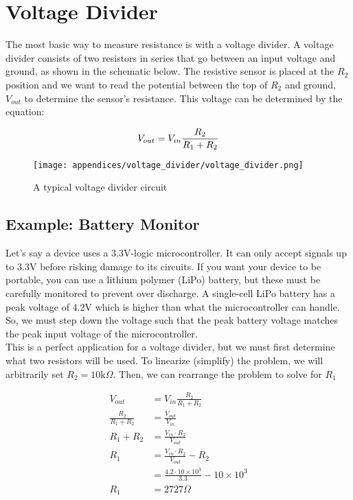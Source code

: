 \chapter{Voltage Divider} 
The most basic way to measure resistance is with a voltage divider.
A voltage divider consists of two resistors in series that go between an input voltage and ground, as shown in the schematic below.
The resistive sensor is placed at the $R_2$ position and we want to read the potential between the top of $R_2$ and ground, $V_{out}$ to determine the sensor's resistance.
This voltage can be determined by the equation:

\begin{equation} \labeq{voltage_divider}
    V_{out} = V_{in} \frac{R_2}{R_1 + R_2}
\end{equation}

\begin{figure}[h!]
    \caption{A typical voltage divider circuit}
    \centering
    \texttt{[image: appendices/voltage\_divider/voltage\_divider.png]}
\end{figure}

\section{Example: Battery Monitor}
Let's say a device uses a 3.3V-logic microcontroller.
It can only accept signals up to 3.3V before risking damage to its circuits.
If you want your device to be portable, you can use a lithium polymer (LiPo) battery, but these must be carefully monitored to prevent over discharge.
A single-cell LiPo battery has a peak voltage of 4.2V which is higher than what the microcontroller can handle.
So, we must step down the voltage such that the peak battery voltage matches the peak input voltage of the microcontroller. \\

This is a perfect application for a voltage divider, but we must first determine what two resistors will be used.
To linearize (simplify) the problem, we will arbitrarily set $R_2 = 10\text{k} \Omega$.
Then, we can rearrange the problem to solve for $R_1$

\begin{align*}
    V_{out}                 &= V_{in} \frac{R_2}{R_1 + R_2} \\
    \frac{R_2}{R_1 + R_2}   &= \frac{V_{out}}{V_{in}} \\
    R_1 + R_2               &= \frac{V_{in} \cdot R_2}{V_{out}}\\
    R_1                     &= \frac{V_{in} \cdot R_2}{V_{out}} - R_2 \\
                            &= \frac{4.2 \cdot 10\times10^3}{3.3} - 10\times10^3 \\
    R_1                     &= 2727 \Omega
\end{align*}

